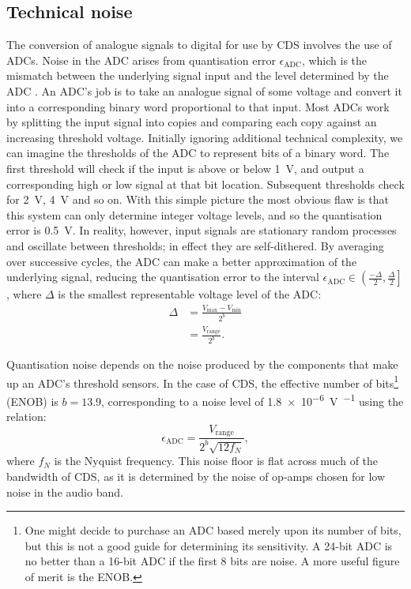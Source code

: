 \subsection{Technical noise}
The conversion of analogue signals to digital for use by \gls{CDS} involves the use of \glspl{ADC}. Noise in the \gls{ADC} arises from quantisation error $\epsilon_{\text{ADC}}$, which is the mismatch between the underlying signal input and the level determined by the \gls{ADC} \cite{Allen1997}. An \gls{ADC}'s job is to take an analogue signal of some voltage and convert it into a corresponding binary word proportional to that input. Most \glspl{ADC} work by splitting the input signal into copies and comparing each copy against an increasing threshold voltage. Initially ignoring additional technical complexity, we can imagine the thresholds of the \gls{ADC} to represent bits of a binary word. The first threshold will check if the input is above or below \SI{1}{\volt}, and output a corresponding high or low signal at that bit location. Subsequent thresholds check for \SI{2}{\volt}, \SI{4}{\volt} and so on. With this simple picture the most obvious flaw is that this system can only determine integer voltage levels, and so the quantisation error is \SI{0.5}{\volt}. In reality, however, input signals are stationary random processes and oscillate between thresholds; in effect they are self-dithered. By averaging over successive cycles, the \gls{ADC} can make a better approximation of the underlying signal, reducing the quantisation error to the interval $\epsilon_{\text{ADC}} \in \left( \frac{-\Delta}{2}, \frac{\Delta}{2} \right]$, where $\Delta$ is the smallest representable voltage level of the \gls{ADC}:
\begin{equation}
  \begin{split}
    \Delta &= \frac{V_{\text{max}} - V_{\text{min}}}{2^{b}} \\
           &= \frac{V_{\text{range}}}{2^{b}}.
  \end{split}
\end{equation}

Quantisation noise depends on the noise produced by the components that make up an \gls{ADC}'s threshold sensors. In the case of \gls{CDS}, the effective number of bits\footnote{One might decide to purchase an \gls{ADC} based merely upon its number of bits, but this is not a good guide for determining its sensitivity. A 24-bit \gls{ADC} is no better than a 16-bit \gls{ADC} if the first 8 bits are noise. A more useful figure of merit is the \gls{ENOB}.} (\gls{ENOB}) is $b = 13.9$, corresponding to a noise level of \SI{1.8e-6}{\volt\per\sqrthz} using the relation:
\begin{equation}
  \epsilon_{\text{ADC}} = \frac{V_{\text{range}}}{2^b \sqrt{12 f_{N}}},
\end{equation}
where $f_{N}$ is the Nyquist frequency. This noise floor is flat across much of the bandwidth of \gls{CDS}, as it is determined by the noise of op-amps chosen for low noise in the audio band.

